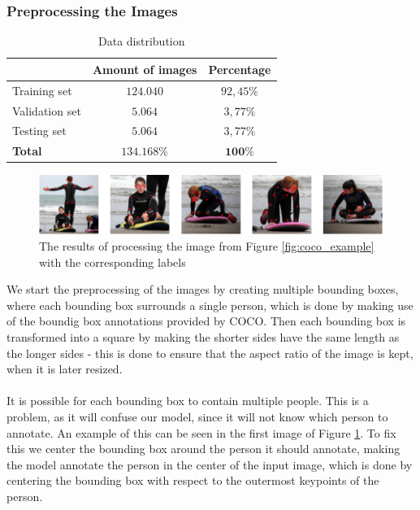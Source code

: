 \documentclass[./main.tex]{subfiles}
\begin{document}
\subsubsection{Preprocessing the Images}
\begin{table}[htbp]
    \centering
    \begin{tabular}{l|c|c}
         & Amount of images & Percentage \\
        \hline
        Training set & $124.040$ & $92,45\%$ \\
        \hline
        Validation set & $5.064$ & $3,77\%$ \\
        \hline
        Testing set & $5.064$ & $3,77\%$ \\
        \hline
        \hline
        \textbf{Total} & $\bm{134.168}\%$ & $\bm{100}\%$ \\
        \hline
    \end{tabular}
    \caption{Data distribution}
    \label{tab:data_distribution}
\end{table}
\begin{figure}[htbp]
    \centering
    \includegraphics[width = \textwidth - 2 cm]{./entities/crop_img.PNG}
    \caption{The results of processing the image from Figure \ref{fig:coco_example} with the corresponding labels \cite{COCO_article}}
    \label{fig:crop_img}
\end{figure}
\noindent We start the preprocessing of the images by creating multiple bounding boxes, where each bounding box surrounds a single person, which is done by making use of the boundig box annotations provided by COCO. Then each bounding box is transformed into a square by making the shorter sides have the same length as the longer sides - this is done to ensure that the aspect ratio of the image is kept, when it is later resized. 
\\
\\
It is possible for each bounding box to contain multiple people. This is a problem, as it will confuse our model, since it will not know which person to annotate. An example of this can be seen in the first image of Figure \ref{fig:crop_img}. To fix this we center the bounding box around the person it should annotate, making the model annotate the person in the center of the input image, which is done by centering the bounding box with respect to the outermost keypoints of the person.
\end{document}
